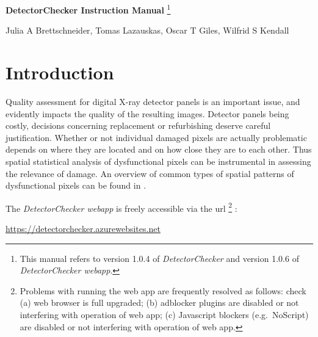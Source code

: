 \documentclass[11pt,a4paper]{article}
\newcommand{\DetectorChecker}{\emph{DetectorChecker}\xspace}
\newcommand{\DetectorCheckerWebApp}{\emph{DetectorChecker webapp}\xspace}
\begin{document}


\begin{center}

{\LARGE\bf DetectorChecker Instruction Manual}
\footnote{This manual refers to version 1.0.4 of \DetectorChecker and version 1.0.6 of \DetectorCheckerWebApp.}


\bigskip
{\large Julia A Brettschneider, Tomas Lazauskas, Oscar T Giles, Wilfrid S Kendall}

\end{center}




\section{Introduction}\label{int}

Quality assessment for digital X-ray detector panels is an important issue, and evidently
impacts the quality of the resulting images. 
Detector panels being costly, 
decisions concerning replacement or refurbishing 
deserve careful justification.
Whether or not individual damaged pixels are actually 
problematic depends on where they are located and 
on how close they are to each other.
Thus spatial statistical analysis of dysfunctional pixels can be 
instrumental in assessing the relevance of damage.
An overview of 
common types of spatial patterns of dysfunctional pixels can be found in \cite{brettschneider2014crism}. 

The \DetectorCheckerWebApp is freely accessible via the url \footnote{
	Problems with running the web app are frequently resolved as follows: check (a) web browser is full upgraded; (b) adblocker plugins are disabled or not interfering with operation of web app; (c) Javascript blockers (e.g.~NoScript) are disabled or not interfering with operation of web app.}
:

\begin{mdframed}
	\bigskip
	\centerline{
		{\large
			\url{https://detectorchecker.azurewebsites.net}
		}
	}
	\medskip
\end{mdframed}
\end{document}
